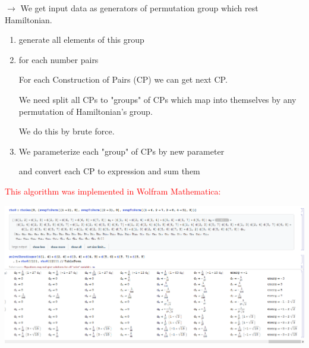 \documentclass[portratit,a1paper,fontscale=0.58]{baposter} %
\begin{document}
\begin{poster}
{\vspace{0.5em}




$\rightarrow$ We get input data as generators of permutation group which rest Hamiltonian.
\begin{enumerate}
\item generate all elements of this group
\item for each number pairs

	For each Construction of Pairs (CP) we can get next CP.
	
	We need split all CPs to "groups" of CPs which map into themselves by any permutation of Hamiltonian's group.
	
	We do this by brute force.
	
\item We parameterize each "group" of CPs by new parameter

and convert each CP to expression and sum them
\end{enumerate}

\textcolor{red}{This algorithm was implemented in Wolfram Mathematica:}

\includegraphics[width=1\linewidth]{result.png}
}


\end{poster}
\end{document}
